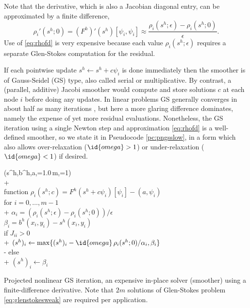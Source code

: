 \documentclass[letterpaper,final,12pt,reqno]{amsart}
\theoremstyle{claim}
\newcommand{\eps}{\epsilon}
\newcommand{\ip}[2]{\left(#1,#2\right)}
\numberwithin{equation}{section}
\numberwithin{figure}{section}
\numberwithin{table}{section}
\numberwithin{theorem}{section}
\begin{document}
Note that the derivative, which is also a Jacobian diagonal entry, can be approximated by a finite difference,
\begin{equation}
\rho_i'(s^h; 0) = (F^h)'(s^h)[\psi_i,\psi_i] \approx \frac{\rho_i(s^h; \eps) - \rho_i(s^h; 0)}{\eps}.  \label{eq:rhofd}
\end{equation}
Use of \eqref{eq:rhofd} is very expensive because each value $\rho_i(s^h; \eps)$ requires a separate Glen-Stokes computation for the residual.

If each pointwise update $s^h \gets s^h + c \psi_i$ is done immediately then the smoother is of Gauss-Seidel (GS) type, also called serial or multiplicative.  By contrast, a (parallel, additive) Jacobi smoother would compute and store solutions $c$ at each node $i$ before doing any updates.  In linear problems GS generally converges in about half as many iterations \cite{Greenbaum1997}, but here a more glaring difference dominates, namely the expense of yet more residual evaluations.  Nonetheless, the GS iteration using a single Newton step and approximation \eqref{eq:rhofd} is a well-defined smoother, so we state it in Pseudocode \ref{pc:pngsslow}, in a form which also allows over-relaxation ($\id{omega} > 1$) or under-relaxation ($\id{omega} < 1$) if desired.

\begin{pcode}[ht]
\begin{pseudo*}
(s^h,b^h,a,=1.0\,m,=1)\text{:} \\+
     \\
    function $\rho_i(s^h; c) = F^h(s^h+c\psi_i)[\psi_i] - \ip{a}{\psi_i}$ \\
    for $i = 0,\dots,m-1$ \\+
        $\alpha_i = (\rho_i(s^h; \eps) - \rho_i(s^h; 0))/\eps$  \qquad\qquad {} \\
        $\beta_i = b^h(x_i,y_i) - s^h(x_i,y_i)$ \qquad\qquad {} \\
        if $J_{ii} > 0$ \\+
            $(s^h)_i \gets \max\{(s^h)_i - \id{omega}\,\rho_i(s^h; 0) / \alpha_i, \beta_i\}$ \\-
        else \\+
            $(s^h)_i \gets \beta_i$ \qquad\qquad {}
\end{pseudo*}
\caption{Projected nonlinear GS iteration, an expensive in-place solver (smoother) using a finite-difference derivative.  Note that $2m$ solutions of Glen-Stokes problem \eqref{eq:glenstokesweak} are required per application.}
\label{pc:pngsslow}
\end{pcode}
\end{document}
